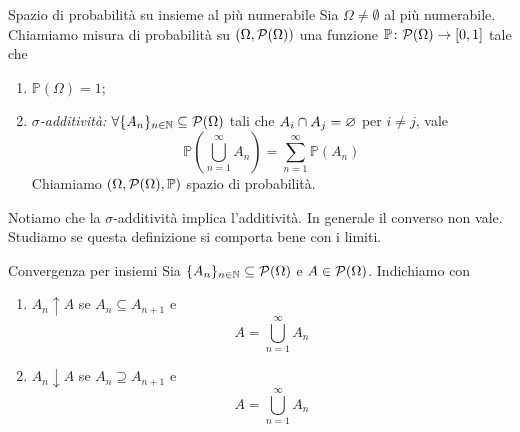 \documentclass[a4paper]{article}
\begin{document}
\begin{snippetdefinition}{Spazio di probabilità su insieme al più numerabile}
    Sia \(\Omega \neq \emptyset\) al più numerabile.
    Chiamiamo misura di probabilità su \((\Omega, \mathcal P(\Omega))\)
    una funzione \(\mathbb P\colon \mathcal P(\Omega)\to [0,1]\)
    tale che
    \begin{enumerate}
        \item \(\mathbb P(\Omega) = 1\);
        \item \emph{\(\sigma\)-additività:} \(\forall \{A_n\}_{n\in\mathbb{N}} \subseteq \mathcal P(\Omega)\)
            tali che \(A_i \cap A_j = \varnothing\) per \(i \neq j\), vale
            \[
                \mathbb P \left(
                    \bigcup_{n=1}^\infty A_n
                \right) = \sum_{n=1}^\infty \mathbb P(A_n)
            \]
            Chiamiamo \((\Omega, \mathcal P(\Omega), \mathbb P)\) spazio di probabilità.
    \end{enumerate}
\end{snippetdefinition}

Notiamo che la \(\sigma\)-additività
implica l'additività.
In generale il converso non vale.
Studiamo se questa definizione si comporta bene con i limiti.

\begin{snippetdefinition}{Convergenza per insiemi}
    Sia \(\{A_n\}_{n \in \mathbb{N}} \subseteq \mathcal P(\Omega)\)
    e \(A \in \mathcal P(\Omega)\).
    Indichiamo con
    \begin{enumerate}
        \item \(A_n \uparrow A\)
            se \(A_n \subseteq A_{n+1}\) e \[
                A = \bigcup_{n=1}^\infty A_n
            \]
        \item \(A_n \downarrow A\)
            se \(A_n \supseteq A_{n+1}\) e \[
                A = \bigcup_{n=1}^\infty A_n
            \]
    \end{enumerate}
\end{snippetdefinition}
\end{document}
